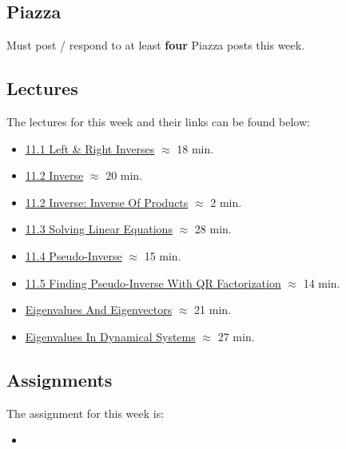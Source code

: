 \subsection{Piazza}

Must post / respond to at least \textbf{four} Piazza posts this week.

\subsection{Lectures}

The lectures for this week and their links can be found below:

\begin{itemize}
    \item \href{https://applied.cs.colorado.edu/mod/hvp/view.php?id=50802}{11.1 Left \& Right Inverses} $\approx$ 18 min.
    \item \href{https://applied.cs.colorado.edu/mod/hvp/view.php?id=50803}{11.2 Inverse} $\approx$ 20 min.
    \item \href{https://applied.cs.colorado.edu/mod/hvp/view.php?id=50804}{11.2 Inverse: Inverse Of Products} $\approx$ 2 min.
    \item \href{https://applied.cs.colorado.edu/mod/hvp/view.php?id=50805}{11.3 Solving Linear Equations} $\approx$ 28 min.
    \item \href{https://applied.cs.colorado.edu/mod/hvp/view.php?id=50806}{11.4 Pseudo-Inverse} $\approx$ 15 min.
    \item \href{https://applied.cs.colorado.edu/mod/hvp/view.php?id=50807}{11.5 Finding Pseudo-Inverse With QR Factorization} $\approx$ 14 min.
    \item \href{https://applied.cs.colorado.edu/mod/hvp/view.php?id=50808}{Eigenvalues And Eigenvectors} $\approx$ 21 min.
    \item \href{https://applied.cs.colorado.edu/mod/hvp/view.php?id=50809}{Eigenvalues In Dynamical Systems} $\approx$ 27 min.
\end{itemize}

\subsection{Assignments}

The assignment for this week is:

\begin{itemize}
    \item {}
\end{itemize}

